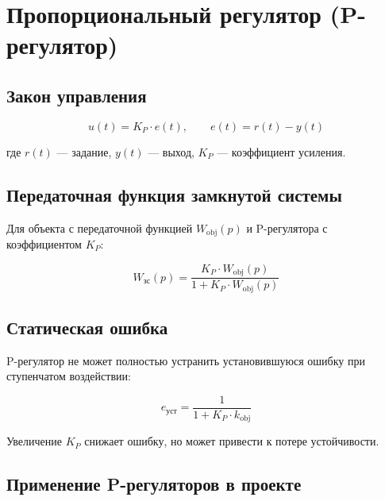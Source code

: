 \section{Пропорциональный регулятор (P-регулятор)}
\label{sec:p_controller}

\subsection{Закон управления}

\begin{equation}
  u(t) = K_P \cdot e(t), \qquad e(t) = r(t) - y(t)
  \label{eq:p_controller}
\end{equation}

где $r(t)$ --- задание, $y(t)$ --- выход, $K_P$ --- коэффициент усиления.

\subsection{Передаточная функция замкнутой системы}

Для объекта с передаточной функцией $W_{\text{obj}}(p)$
и P-регулятора с коэффициентом $K_P$:

\begin{equation}
  W_{\text{зс}}(p) = \frac{K_P \cdot W_{\text{obj}}(p)}{1 + K_P \cdot W_{\text{obj}}(p)}
  \label{eq:closed_loop}
\end{equation}

\subsection{Статическая ошибка}

P-регулятор не может полностью устранить установившуюся ошибку
при ступенчатом воздействии:

\begin{equation}
  e_{\text{уст}} = \frac{1}{1 + K_P \cdot k_{\text{obj}}}
  \label{eq:static_error}
\end{equation}

Увеличение $K_P$ снижает ошибку, но может привести к
потере устойчивости.

\subsection{Применение P-регуляторов в проекте}

